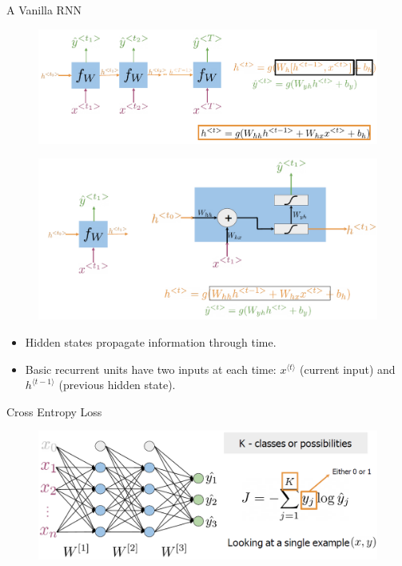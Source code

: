 \begin{frame}[allowframebreaks]{A Vanilla RNN}
    \begin{figure}
        \centering
        \includegraphics[width=\linewidth, height=0.9\textheight,keepaspectratio]{images/nlp/rnn-vanilla.png}
    \end{figure}

    \framebreak

    \begin{figure}
        \centering
        \includegraphics[width=\linewidth, height=0.9\textheight,keepaspectratio]{images/nlp/rnn-vanilla-2.png}
    \end{figure}

    \begin{itemize}
        \item Hidden states propagate information through time.
        \item Basic recurrent units have two inputs at each time: $x^{\langle t \rangle}$ (current input) and $h^{\langle t-1 \rangle}$ (previous hidden state).
    \end{itemize}
\end{frame}

\begin{frame}{Cross Entropy Loss}
    \begin{figure}
        \centering
        \includegraphics[width=\linewidth, height=0.9\textheight,keepaspectratio]{images/nlp/rnn-cross-entropy.png}
    \end{figure}
\end{frame}

